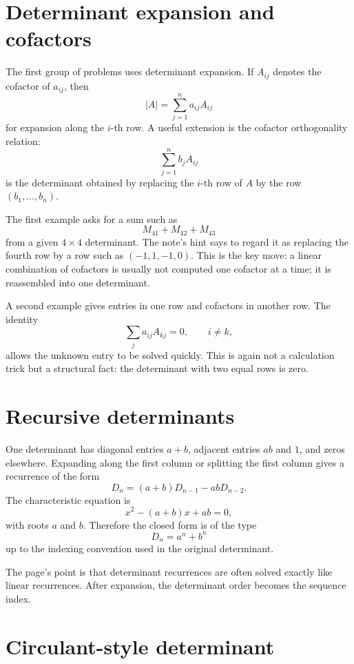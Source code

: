 


\section{Determinant expansion and cofactors}

The first group of problems uses determinant expansion.  If $A_{ij}$ denotes the cofactor of $a_{ij}$, then
\[
  |A|=\sum_{j=1}^n a_{ij}A_{ij}
\]
for expansion along the $i$-th row.  A useful extension is the cofactor orthogonality relation:
\[
  \sum_{j=1}^n b_j A_{ij}
\]
is the determinant obtained by replacing the $i$-th row of $A$ by the row $(b_1,\ldots,b_n)$.

The first example asks for a sum such as
\[
  M_{41}+M_{42}+M_{43}
\]
from a given $4\times4$ determinant.  The note's hint says to regard it as replacing the fourth row by a row such as $(-1,1,-1,0)$.  This is the key move: a linear combination of cofactors is usually not computed one cofactor at a time; it is reassembled into one determinant.

A second example gives entries in one row and cofactors in another row.  The identity
\[
  \sum_j a_{ij}A_{kj}=0,\qquad i\ne k,
\]
allows the unknown entry to be solved quickly.  This is again not a calculation trick but a structural fact: the determinant with two equal rows is zero.

\section{Recursive determinants}

One determinant has diagonal entries $a+b$, adjacent entries $ab$ and $1$, and zeros elsewhere.  Expanding along the first column or splitting the first column gives a recurrence of the form
\[
  D_n=(a+b)D_{n-1}-abD_{n-2}.
\]
The characteristic equation is
\[
  x^2-(a+b)x+ab=0,
\]
with roots $a$ and $b$.  Therefore the closed form is of the type
\[
  D_n=a^n+b^n
\]
up to the indexing convention used in the original determinant.

The page's point is that determinant recurrences are often solved exactly like linear recurrences.  After expansion, the determinant order becomes the sequence index.

\section{Circulant-style determinant}


